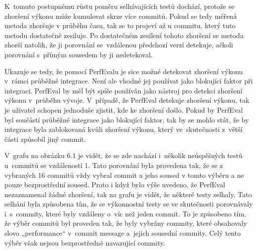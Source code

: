K~tomuto postupnému růstu poměru selhávajících testů dochází, protože se zhoršení výkonu může kumulovat skrze více commitů.
Pokud se tedy měřená metoda zhoršuje v průběhu času, tak se to projeví až u commitu, který tuto metodu dostatečně zesiluje.
Po dostatečném zesílení tohoto zhoršení se metoda zhorší natolik, že ji porovnání se~vzdálenou předchozí verzí detekuje, ačkoli
porovnání s~přímým sousedem by ji nedetekoval.

Ukazuje se tedy, že pomocí PerfEvalu je sice možné detekovat zhoršení výkonu v~rámci průběžné integrace.
Není ale vhodné jej používat jako blokující faktor při integraci. PerfEval by měl být spíše používán jako nástroj
pro detekci zhoršení výkonu v~průběhu vývoje. V~případě, že PerfEval detekuje zhoršení výkonu, tak je uživatel
schopen jednoduše zjistit, kde ke zhoršení došlo. Pokud by PerfEval byl součástí průběžné integrace jako blokující faktor,
tak by se mohlo stát, že by integrace byla zablokovaná kvůli zhoršení výkonu, který ve~skutečnosti z~větší části způsobil jiný commit.

V~grafu na obrázku 6.1 je vidět, že se zde nachází i~několik neúspěšných testů u~commitů se vzdáleností 1.
Tato porovnání byla provedena tak, že se z vybraných 16 commitů vždy vybral commit a jeho soused v tomto
výběru a ne pouze bezprostřední soused. Proto i když bylo výše uvedeno, že PerfEval nezaznamenal žádné zhoršení,
tak na grafu je vidět, že některé testy selhaly. Tato selhání byla způsobena tím, že se výkonnostní testy
se ve skutečnosti porovnávaly i~s~commity, které byly vzdáleny o~víc než jeden commit. To je způsobeno tím,
že výběr commitů byl proveden tak, že byly vybrány commity, které obsahovaly slovo „performance“ v~commit message
a~jejich sousední commity. Celý tento výběr však nejsou bezprostředně navazující commity.